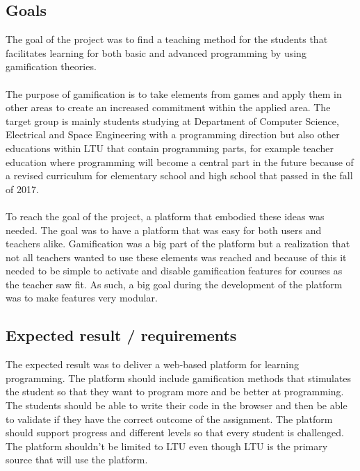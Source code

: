 \subsection{Goals}   
The goal of the project was to find a teaching method for the students that facilitates learning for both basic and advanced programming by using gamification theories.
\\ \\
The purpose of gamification is to take elements from games and apply them in other areas to create an increased commitment within the applied area.
The target group is mainly students studying at Department of Computer Science, Electrical and Space Engineering  with a programming direction but also other educations within LTU that contain programming parts, for example teacher education where programming will become a central part in the future because of a revised curriculum for elementary school and high school that passed in the fall of 2017.
\\ \\
To reach the goal of the project, a platform that embodied these ideas was needed.
The goal was to have a platform that was easy for both users and teachers alike. Gamification was a big part of the platform but a realization that not all teachers wanted to use these elements was reached and because of this it needed to be simple to activate and disable gamification features for courses as the teacher saw fit. As such, a big goal during the development of the platform was to make features very modular.

\subsection{Expected result / requirements}  
The expected result was to deliver a web-based platform for learning programming. The platform should include gamification methods that stimulates the student so that they want to program more and be better at programming. The students should be able to write their code in the browser and then be able to validate if they have the correct outcome of the assignment. The platform should support progress and different levels so that every student is challenged. The platform shouldn't be limited to LTU even though LTU is the primary source that will use the platform. 

